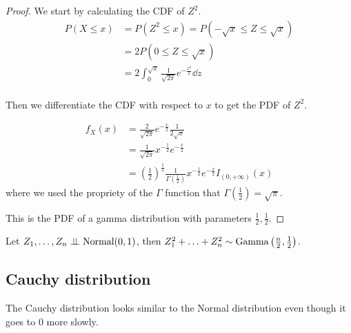 \documentclass[12pt]{extarticle}
\newcommand{\Normal}{{\operatorfont Normal}}
\newcommand{\GammaD}{{\operatorfont Gamma}}
\begin{document}
\begin{proof}
    We start by calculating the CDF of $Z^2$.
    \begin{align}
        P(X \leq x) & = P(Z^2 \leq x) = P(-\sqrt{x} \leq Z \leq \sqrt{x})                  \\
                    & = 2P(0 \leq Z \leq \sqrt{x})                                         \\
                    & = 2\int_0^{\sqrt{x}} \frac{1}{\sqrt{2\pi}} e^{-\frac{z^2}{2}} \dd{z} \\
    \end{align}

    Then we differentiate the CDF with respect to $x$ to get the PDF of $Z^2$.

    \begin{align}
        f_X(x) & = \frac{2}{\sqrt{2\pi}} e^{-\frac{x}{2}} \frac{1}{2\sqrt{x}}                                                                          \\
               & = \frac{1}{\sqrt{2\pi}} x^{-\frac{1}{2}} e^{-\frac{x}{2}}                                                                             \\
               & = \left(\frac{1}{2}\right)^\frac{1}{2} \frac{1}{\Gamma\left(\frac{1}{2}\right)} x^{-\frac{1}{2}} e^{-\frac{x}{2}} I_{(0, +\infty)}(x)
    \end{align}
    where we used the propriety of the $\Gamma$ function that $\Gamma\left(\frac{1}{2}\right) = \sqrt{\pi}$.

    This is the PDF of a gamma distribution with parameters $\frac{1}{2}, \frac{1}{2}$.
\end{proof}

\begin{lemma}
    Let $Z_1, \ldots, Z_n \indep \Normal(0, 1)$, then $Z_1^2 + \ldots + Z_n^2 \sim \GammaD\left(\frac{n}{2}, \frac{1}{2}\right)$.
\end{lemma}

\subsection{Cauchy distribution}

The Cauchy distribution looks similar to the Normal distribution even though it goes to $0$ more slowly.
\end{document}
